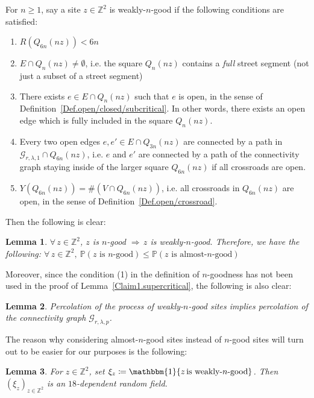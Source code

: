 \documentclass[10pt,a4paper]{amsart}
\theoremstyle{exampstyle}
\newtheorem{Lemma}{Lemma}
\theoremstyle{exampnotations}
\begin{document}
For $n \geq 1$, say a site $z \in \mathbb{Z}^{2}$ is weakly-$n$-good if the following conditions are satisfied:
\begin{enumerate}
\item[$\widetilde{(1)}$] $R(Q_{6n}(nz)) < 6n$
\item[(2)]  $E \cap Q_n(nz) \neq \emptyset$, i.e. the square $Q_n(nz)$ contains a \emph{full} street segment (not just a subset of a street segment)
\item[(3)]  There exists $e \in E \cap Q_n(nz)$ such that $e$ is open, in the sense of Definition~\ref{Def.open/closed/subcritical}. In other words, there exists an open edge which is fully included in the square $Q_n(nz)$.
\item[(4)]  Every two open edges $e,e' \in E \cap Q_{3n}(nz)$ are connected by a path in $\mathcal{G}_{r,\lambda,1}\cap Q_{6n}(nz)$, i.e. $e$ and $e'$ are connected by a path of the connectivity graph staying inside of the larger square $Q_{6n}(nz)$ if all crossroads are open.
\item[(5)]  $Y(Q_{6n}(nz)) = \#(V \cap Q_{6n}(nz))$, i.e. all crossroads in $Q_{6n}(nz)$ are open, in the sense of Definition~\ref{Def.open/crossroad}.
\end{enumerate}
Then the following is clear:
\begin{Lemma}
\label{Lemma1.almost}
$\forall \, z \in \mathbb{Z}^{2}$, $z$ is $n$-good $\Rightarrow \, z$ is weakly-$n$-good. Therefore, we have the following: $\forall \, z \in \mathbb{Z}^{2}, \: \mathbb{P}(\text{$z$ is $n$-good}) \leq \mathbb{P}(\text{$z$ is almost-$n$-good})$
\end{Lemma} Moreover, since the condition (1) in the definition of $n$-goodness has not been used in the proof of Lemma~\ref{Claim1.supercritical}, the following is also clear:
\begin{Lemma}
\label{Lemma2.almost}
Percolation of the process of weakly-$n$-good sites implies percolation of the connectivity graph $\mathcal{G}_{r,\lambda,p}$.
\end{Lemma}
The reason why considering almost-$n$-good sites instead of $n$-good sites will turn out to be easier for our purposes is the following:
\begin{Lemma}
\label{Claim2.supercritical}
For $z \in \mathbb{Z}^{2}$, set $\xi_{z} \coloneqq \mathbbm{1}\lbrace z \, \text{is weakly-$n$-good} \rbrace$. Then $(\xi_{z})_{z \in \mathbb{Z}^{2}}$ is an $18$-dependent random field.
\end{Lemma}
\end{document}
